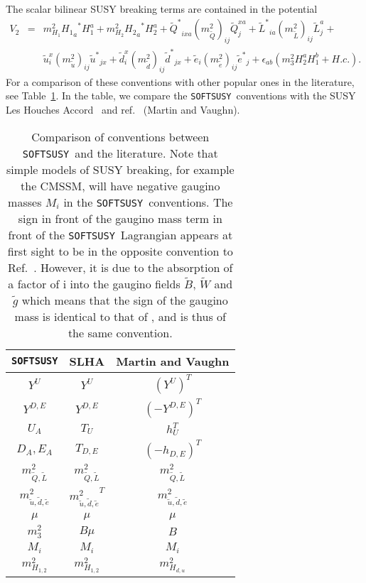 \documentclass{article}
\def\SOFTSUSY{{\tt SOFTSUSY}}
\begin{document}
The scalar bilinear SUSY breaking terms are contained in the potential
\begin{eqnarray}
V_2 &=& m_{H_1}^2 {{H_1}_a}^* {H_1^a} + m_{H_2}^2 {{H_2}_a}^* {H_2^a} +
{\tilde{Q}^*}_{ixa} (m_{\tilde Q}^2)_{ij} \tilde{Q}_j^{xa} +
{\tilde{L}^*}_{ia} (m_{\tilde L}^2)_{ij} \tilde{L}_j^{a}  + \nonumber \\ &&
 \tilde{u}_i^{x} (m_{\tilde u}^2)_{ij}  {\tilde{u}^*}_{jx} +
\tilde{d}_i^{x} (m_{\tilde d}^2)_{ij}  {\tilde{d}^*}_{jx} +
\tilde{e}_i (m_{\tilde e}^2)_{ij} {\tilde{e}^*}_{j} +
\epsilon_{ab} (m_3^2 H_2^a H_1^b + H.c.).
\end{eqnarray}
For a comparison of these conventions with other popular ones in the
literature, see Table~\ref{tab:conv}. In the table, we compare the
\SOFTSUSY~conventions with the 
SUSY Les Houches Accord~\cite{lhacc} and ref.~\cite{mandv} (Martin and Vaughn).
%
\begin{table}\begin{center}
\begin{tabular}{ccc}
\SOFTSUSY & SLHA & Martin and Vaughn \\ \hline
$Y^{U}$ & $Y^{U}$ & $({Y^{U}})^T$ \\
$Y^{D,E}$ & $Y^{D,E}$ & $(-{Y^{D,E}})^T$ \\
$U_A$ & $T_{U}$ & $h_{U}^T$ \\
$D_A, E_A$ & $T_{D,E}$ & $(-h_{D,E})^T$ \\
$m_{{\tilde Q},{\tilde L}}^2$ & $m_{{\tilde Q},{\tilde L}}^2$ & $m_{{\tilde
    Q},{\tilde L}}^2$ \\
$m_{{\tilde u},{\tilde d},{\tilde e}}^2$ & ${m_{{\tilde u},{\tilde d},{\tilde
    e}}^2}^T$ &
$m_{{\tilde u},{\tilde d},{\tilde e}}^2$\\
$\mu$ & $\mu$ & $\mu$ \\
$m_3^2$ & $B \mu$ & $B$  \\
$M_i$ & $M_i$ & $M_i$ \\
$m_{H_{1,2}}^2$ & $m_{H_{1,2}}^2$& $m_{H_{d,u}}^2$ \\
\end{tabular}
\caption{\label{tab:conv} Comparison of conventions between \SOFTSUSY~and the literature. Note
  that simple models of SUSY breaking, for example the CMSSM, will have
  negative gaugino masses $M_i$ in the
  \SOFTSUSY~conventions. The sign in front of the gaugino mass
    term in front of the \SOFTSUSY~Lagrangian appears at first sight to be in
    the     opposite convention 
    to Ref.~\cite{mandv}. However, it is due to the absorption of a factor of
    i into the gaugino fields $\tilde B$, $\tilde W$ and $\tilde g$ which
    means that the sign of the gaugino mass is identical to that of
    \cite{mandv}, and is thus of the same convention.}
\end{center}\end{table}
\end{document}
